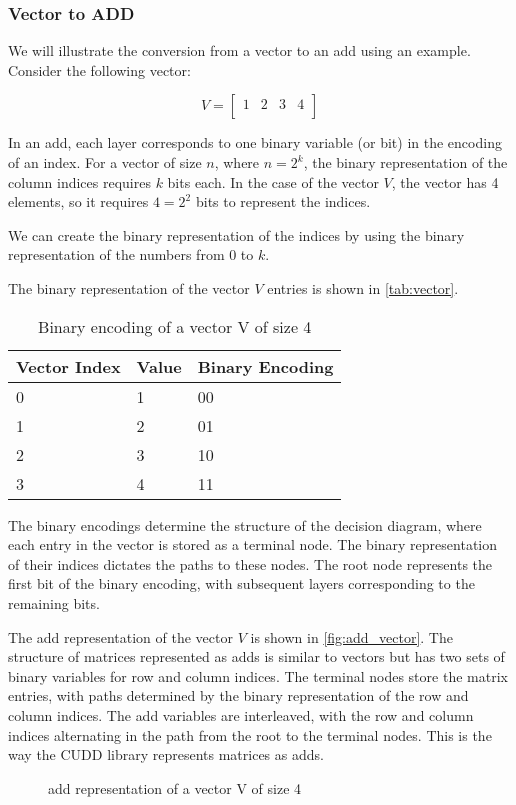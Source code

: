 \subsubsection{Vector to ADD}
We will illustrate the conversion from a vector to an \gls{add} using an example.
Consider the following vector:

\[
    V=
    \begin{bmatrix}
        1 & 2 & 3 & 4 \\
    \end{bmatrix}
\]

In an \gls{add}, each layer corresponds to one binary variable (or bit) in the encoding of an index. 
For a vector of size $n$, where $n = 2^k$, the binary representation of the column indices requires $k$ bits each. 
In the case of the vector $V$, the vector has 4 elements, so it requires $4 = 2^2$ bits to represent the indices.

We can create the binary representation of the indices by using the binary representation of the numbers from 0 to $k$.

The binary representation of the vector $V$ entries is shown in \autoref{tab:vector}.
\begin{table}
    \centering
    \caption{Binary encoding of a vector V of size 4}
    \label{tab:vector}
    \begin{tabular}{lll}
        \toprule
        Vector Index & Value & Binary Encoding \\
        \midrule
        0            & 1     & 00            \\
        1            & 2     & 01            \\
        2            & 3     & 10            \\
        3            & 4     & 11            \\
        \bottomrule
    \end{tabular}
\end{table}
The binary encodings determine the structure of the decision diagram, where each entry in the vector is stored as a terminal node.
The binary representation of their indices dictates the paths to these nodes.
The root node represents the first bit of the binary encoding, with subsequent layers corresponding to the remaining bits.

The \gls{add} representation of the vector $V$ is shown in \autoref{fig:add_vector}.
The structure of matrices represented as \glspl{add} is similar to vectors but has two sets of binary variables for row and column indices.
The terminal nodes store the matrix entries, with paths determined by the binary representation of the row and column indices.
The \gls{add} variables are interleaved, with the row and column indices alternating in the path from the root to the terminal nodes.
This is the way the CUDD library represents matrices as \glspl{add}.
\begin{figure}
    \centering
    
    \caption{\gls{add} representation of a vector V of size 4}
    \label{fig:add_vector}
\end{figure}

